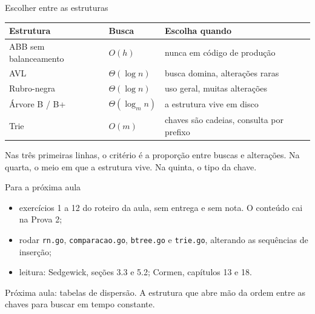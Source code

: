 \documentclass{beamer}
\begin{document}
\begin{frame}{Escolher entre as estruturas}
	\begin{center}
		\small
		\begin{tabular}{ll>{\raggedright\arraybackslash}p{4.2cm}}
			\toprule
			\textbf{Estrutura}    & \textbf{Busca}     & \textbf{Escolha quando}                  \\
			\midrule
			ABB sem balanceamento & $O(h)$             & nunca em código de produção              \\
			AVL                   & $\Theta(\log n)$   & busca domina, alterações raras           \\
			Rubro-negra           & $\Theta(\log n)$   & uso geral, muitas alterações             \\
			Árvore B / B+         & $\Theta(\log_m n)$ & a estrutura vive em disco                \\
			Trie                  & $O(m)$             & chaves são cadeias, consulta por prefixo \\
			\bottomrule
		\end{tabular}
	\end{center}

	\vspace{0.4cm}
	Nas três primeiras linhas, o critério é a proporção entre buscas e alterações.
	Na quarta, o meio em que a estrutura vive. Na quinta, o tipo da chave.
\end{frame}

\begin{frame}{Para a próxima aula}
	\begin{itemize}
		\item exercícios 1 a 12 do roteiro da aula, sem entrega e sem nota. O
		      conteúdo cai na Prova 2;
		\item rodar \texttt{rn.go}, \texttt{comparacao.go}, \texttt{btree.go} e
		      \texttt{trie.go}, alterando as sequências de inserção;
		\item leitura: Sedgewick, seções 3.3 e 5.2; Cormen, capítulos 13 e 18.
	\end{itemize}

	\vspace{0.5cm}
	Próxima aula: tabelas de dispersão. A estrutura que abre mão da ordem entre as
	chaves para buscar em tempo constante.
\end{frame}
\end{document}
